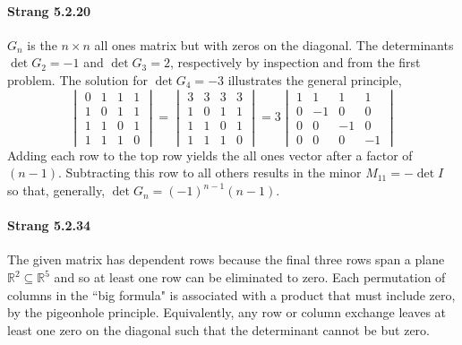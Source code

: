 \documentclass[10pt]{scrartcl}
\begin{document}
\paragraph{Strang 5.2.20} $G_n$ is the $n\times n$ all ones matrix but with zeros on the diagonal. The determinants $\det{G_2} = -1$ and $\det{G_3} = 2$, respectively by inspection and from the first problem. The solution for $\det{G_4}=-3$ illustrates the general principle,
\[
\begin{vmatrix}
	0& 1& 1& 1\\
	1& 0& 1& 1\\
	1& 1& 0& 1\\
	1& 1& 1& 0
\end{vmatrix} = 
\begin{vmatrix}
	3& 3& 3& 3\\
	1& 0& 1& 1\\
	1& 1& 0& 1\\
	1& 1& 1& 0
\end{vmatrix} = 
3\begin{vmatrix}
	1& 1& 1& 1\\
	0& -1&0& 0\\
	0& 0& -1& 0\\
	0& 0& 0& -1
\end{vmatrix}
\]
Adding each row to the top row yields the all ones vector after a factor of $(n-1)$. Subtracting this row to all others results in the minor $M_{11}=-\det{I}$ so that, generally, $\det{G_n} = (-1)^{n-1}(n-1)$.

\paragraph{Strang 5.2.34} The given matrix has dependent rows because the final three rows span a plane $\mathbb{R}^{2}\subseteq \mathbb{R}^{5}$ and so at least one row can be eliminated to zero. Each permutation of columns in the ``big formula" is associated with a product that must include zero, by the pigeonhole principle. Equivalently, any row or column exchange leaves at least one zero on the diagonal such that the determinant cannot be but zero.
\end{document}
